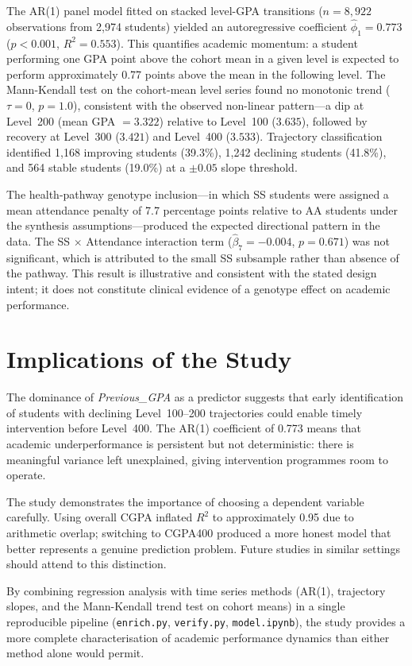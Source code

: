 \documentclass[12pt]{report}
\begin{document}
	The AR(1) panel model fitted on stacked level-GPA transitions ($n = 8{,}922$ observations from 2,974 students) yielded an autoregressive coefficient $\hat{\phi}_1 = 0.773$ ($p < 0.001$, $R^2 = 0.553$). This quantifies academic momentum: a student performing one GPA point above the cohort mean in a given level is expected to perform approximately 0.77 points above the mean in the following level. The Mann-Kendall test on the cohort-mean level series found no monotonic trend ($\tau = 0$, $p = 1.0$), consistent with the observed non-linear pattern---a dip at Level~200 (mean GPA $= 3.322$) relative to Level~100 ($3.635$), followed by recovery at Level~300 ($3.421$) and Level~400 ($3.533$). Trajectory classification identified 1,168 improving students (39.3\%), 1,242 declining students (41.8\%), and 564 stable students (19.0\%) at a $\pm 0.05$ slope threshold.
	
	The health-pathway genotype inclusion---in which SS students were assigned a mean attendance penalty of 7.7 percentage points relative to AA students under the synthesis assumptions---produced the expected directional pattern in the data. The SS $\times$ Attendance interaction term ($\hat{\beta}_7 = -0.004$, $p = 0.671$) was not significant, which is attributed to the small SS subsample rather than absence of the pathway. This result is illustrative and consistent with the stated design intent; it does not constitute clinical evidence of a genotype effect on academic performance.
	
	\section{Implications of the Study}
	The dominance of \textit{Previous\_GPA} as a predictor suggests that early identification of students with declining Level~100--200 trajectories could enable timely intervention before Level~400. The AR(1) coefficient of 0.773 means that academic underperformance is persistent but not deterministic: there is meaningful variance left unexplained, giving intervention programmes room to operate.
	
	The study demonstrates the importance of choosing a dependent variable carefully. Using overall CGPA inflated $R^2$ to approximately 0.95 due to arithmetic overlap; switching to CGPA400 produced a more honest model that better represents a genuine prediction problem. Future studies in similar settings should attend to this distinction.
	
	By combining regression analysis with time series methods (AR(1), trajectory slopes, and the Mann-Kendall trend test on cohort means) in a single reproducible pipeline (\texttt{enrich.py}, \texttt{verify.py}, \texttt{model.ipynb}), the study provides a more complete characterisation of academic performance dynamics than either method alone would permit.
	
\end{document}
